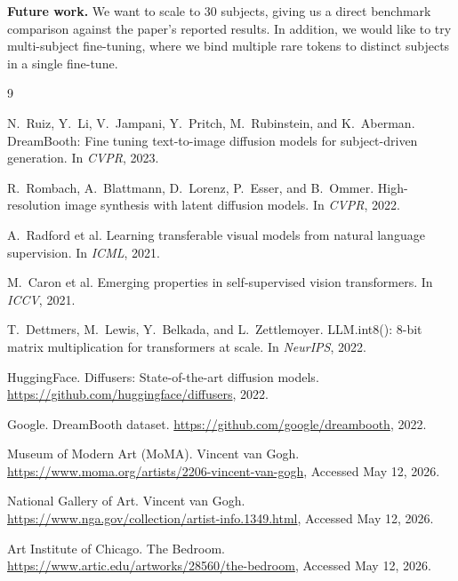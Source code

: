 \documentclass[11pt]{article}
\begin{document}
\textbf{Future work.} We want to scale to 30 subjects, giving us a direct benchmark comparison against the paper's reported results. In addition, we would like to try multi-subject fine-tuning, where we bind multiple rare tokens to distinct subjects in a single fine-tune.

\newpage
\begin{thebibliography}{9}

N.~Ruiz, Y.~Li, V.~Jampani, Y.~Pritch, M.~Rubinstein, and K.~Aberman.
\newblock DreamBooth: Fine tuning text-to-image diffusion models for subject-driven generation.
\newblock In \textit{CVPR}, 2023.

R.~Rombach, A.~Blattmann, D.~Lorenz, P.~Esser, and B.~Ommer.
\newblock High-resolution image synthesis with latent diffusion models.
\newblock In \textit{CVPR}, 2022.

A.~Radford et al.
\newblock Learning transferable visual models from natural language supervision.
\newblock In \textit{ICML}, 2021.

M.~Caron et al.
\newblock Emerging properties in self-supervised vision transformers.
\newblock In \textit{ICCV}, 2021.

T.~Dettmers, M.~Lewis, Y.~Belkada, and L.~Zettlemoyer.
\newblock LLM.int8(): 8-bit matrix multiplication for transformers at scale.
\newblock In \textit{NeurIPS}, 2022.

HuggingFace.
\newblock Diffusers: State-of-the-art diffusion models.
\newblock \url{https://github.com/huggingface/diffusers}, 2022.

Google.
\newblock DreamBooth dataset.
\newblock \url{https://github.com/google/dreambooth}, 2022.

Museum of Modern Art (MoMA).
\newblock Vincent van Gogh.
\newblock \url{https://www.moma.org/artists/2206-vincent-van-gogh}, Accessed May 12, 2026.

National Gallery of Art.
\newblock Vincent van Gogh.
\newblock \url{https://www.nga.gov/collection/artist-info.1349.html}, Accessed May 12, 2026.

Art Institute of Chicago.
\newblock The Bedroom.
\newblock \url{https://www.artic.edu/artworks/28560/the-bedroom}, Accessed May 12, 2026.

\end{thebibliography}

\end{document}
